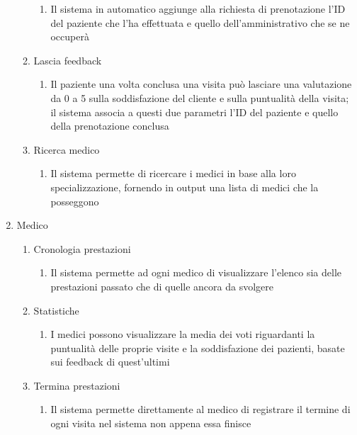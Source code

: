 \documentclass[12pt]{report}
\begin{document}
\begin{enumerate}
\begin{enumerate}
\begin{enumerate}
                        \item Il sistema in automatico aggiunge alla richiesta di prenotazione l'ID del paziente che l'ha effettuata e quello dell'amministrativo che se ne occuperà
                    \end{enumerate}
                \item Lascia feedback
                    \begin{enumerate}
                        \item Il paziente una volta conclusa una visita può lasciare una valutazione da 0 a 5 sulla soddisfazione del cliente e sulla puntualità della visita; il sistema associa a questi due parametri l'ID del paziente e quello della prenotazione conclusa
                    \end{enumerate}
                \item Ricerca medico
                    \begin{enumerate}
                        \item Il sistema permette di ricercare i medici in base alla loro specializzazione, fornendo in output una lista di medici che la posseggono
                    \end{enumerate}
            \end{enumerate}
        \item Medico
            \begin{enumerate}
                \item Cronologia prestazioni
                    \begin{enumerate}
                        \item Il sistema permette ad ogni medico di visualizzare l'elenco sia delle prestazioni passato che di quelle ancora da svolgere
                    \end{enumerate}
                \item Statistiche
                    \begin{enumerate}
                        \item I medici possono visualizzare la media dei voti riguardanti la puntualità delle proprie visite e la soddisfazione dei pazienti, basate sui feedback di quest'ultimi
                    \end{enumerate}
                \item Termina prestazioni
                    \begin{enumerate}
                        \item Il sistema permette direttamente al medico di registrare il termine di ogni visita nel sistema non appena essa finisce

\end{enumerate}
\end{enumerate}
\end{enumerate}
\end{document}
